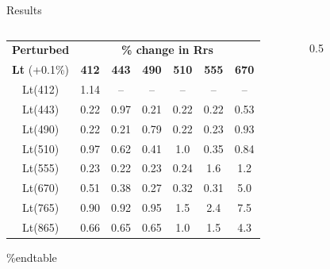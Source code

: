 \documentclass[final]{beamer}
\newlength{\sepwid}
\newlength{\onecolwid}
\newlength{\twocolwid}
\begin{document}
\begin{frame}[t]
\begin{columns}[t]
\begin{column}{\twocolwid}
\begin{block}{Results}
\begin{columns}[t,totalwidth=\twocolwid] %
\begin{column}{\onecolwid}\vspace{-.6in} 
\begin{framed}
\begin{center}
\vspace{2ex}
\begin{tabular}{|*{7}{c|}}
\toprule
\textbf{Perturbed} & \multicolumn{6}{|c|}{\textbf{\% change in Rrs}}\\
\cline{2-7}
\textbf{Lt} (+0.1\%) & \textbf{412} & \textbf{443} & \textbf{490} & \textbf{510} & \textbf{555} & \textbf{670}\\
\midrule
Lt(412) &  1.14 & -- & -- & -- & -- & --\\  
Lt(443) & 0.22 & 0.97 & 0.21 & 0.22 & 0.22 &  0.53\\
Lt(490) & 0.22 & 0.21 & 0.79 & 0.22 & 0.23 &  0.93\\
Lt(510) & 0.97 & 0.62 & 0.41 &  1.0 & 0.35 & 0.84\\
Lt(555) & 0.23 & 0.22 & 0.23 & 0.24 & 1.6 & 1.2\\
Lt(670) & 0.51 & 0.38 & 0.27 & 0.32 & 0.31 &  5.0\\
Lt(765) & 0.90 & 0.92 & 0.95 &  1.5 &  2.4 &  7.5\\
Lt(865) & 0.66 & 0.65 & 0.65 &  1.0 &  1.5 &  4.3\\
\bottomrule
\end{tabular}
\end{center}
\%end{table}
\end{framed}
\end{column} 
\begin{column}{0.5\sepwid}\end{column} %
\begin{column}{\onecolwid}\vspace{-.6in} %


\end{column}
\end{columns}
\end{block}
\end{column}
\end{columns}
\end{frame}
\end{document}
